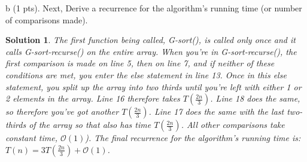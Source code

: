 \documentclass[11pt]{article}
\newtheorem*{solution}{Solution}
\begin{document}
\begin{enumerate}
b (1 pts). Next, Derive a recurrence for the algorithm's running time (or number of comparisons made).
\begin{solution}
	\item The first function being called, \emph{G-sort()}, is called only once and it calls \emph{G-sort-recurse()} on the entire array. When you're in \emph{G-sort-recurse()}, the first comparison is made on line 5, then on line 7, and if neither of these conditions are met, you enter the else statement in line 13. Once in this else statement, you split up the array into two thirds until you're left with either 1 or 2 elements in the array. Line 16 therefore takes $T(\frac{2n}{3})$. Line 18 does the same, so therefore you've got another $T(\frac{2n}{3})$. Line 17 does the same with the last two-thirds of the array so that also has time $T(\frac{2n}{3})$. All other comparisons take constant time, $\mathcal{O}(1)$). The final recurrence for the algorithm's running time is: \textbf{$T(n) = 3T(\frac{2n}{3}) + \mathcal{O}(1)$}.
\end{solution}
\newpage


\end{enumerate}
\end{document}
